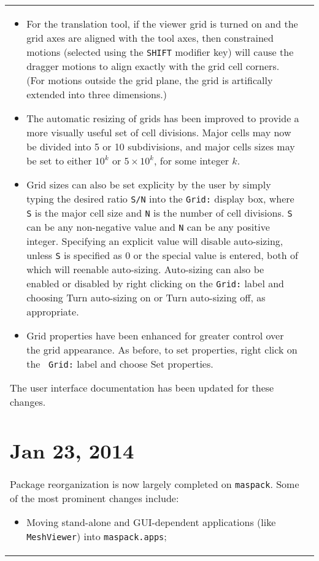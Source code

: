\documentclass{article}
\begin{document}
\begin{tabular}{ll}
\begin{itemize}
\item For the translation tool, if the viewer grid is turned on and
the grid axes are aligned with the tool axes, then constrained motions
(selected using the {\tt SHIFT} modifier key) will cause the dragger
motions to align exactly with the grid cell corners. (For motions
outside the grid plane, the grid is artifically extended into three
dimensions.)

\item The automatic resizing of grids has been improved to provide a
more visually useful set of cell divisions. Major cells may now be
divided into 5 or 10 subdivisions, and major cells sizes may be
set to either $10^k$ or $5 \times 10^k$, for some integer $k$.

\item Grid sizes can also be set explicity by the user by simply
typing the desired ratio {\tt S/N} into the {\tt Grid:} display box,
where {\tt S} is the major cell size and {\tt N} is the number of cell
divisions. {\tt S} can be any non-negative value and {\tt N} can be
any positive integer. Specifying an explicit value will disable
auto-sizing, unless {\tt S} is specified as 0 or the special value
{\tt *} is entered, both of which will reenable
auto-sizing. Auto-sizing can also be enabled or disabled by right
clicking on the {\tt Grid:} label and choosing {\sf Turn auto-sizing
on} or {\sf Turn auto-sizing off}, as appropriate.

\item Grid properties have been enhanced for greater control over the
grid appearance. As before, to set properties, right click on the {\tt
Grid:} label and choose {\sf Set properties}.

\end{itemize}

The user interface documentation has been updated for these changes.

\section*{Jan 23, 2014}

Package reorganization is now largely completed on {\tt maspack}.
Some of the most prominent changes include:

\begin{itemize}

\item Moving stand-alone and GUI-dependent applications (like {\tt
MeshViewer}) into {\tt maspack.apps};


\end{itemize}
\end{tabular}
\end{document}
